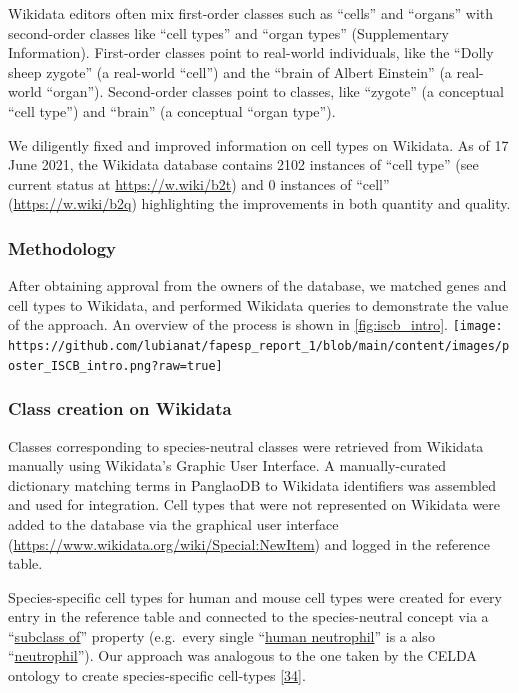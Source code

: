 Wikidata editors often mix first-order classes such as ``cells'' and ``organs'' with second-order classes like ``cell types'' and ``organ types'' (Supplementary Information). First-order classes point to real-world individuals, like the ``Dolly sheep zygote'' (a real-world ``cell'') and the ``brain of Albert Einstein'' (a real-world ``organ''). Second-order classes point to classes, like ``zygote'' (a conceptual ``cell type'') and ``brain'' (a conceptual ``organ type'').

We diligently fixed and improved information on cell types on Wikidata.
As of 17 June 2021, the Wikidata database contains 2102 instances of ``cell type'' (see current status at \url{https://w.wiki/b2t}) and 0 instances of ``cell'' (\url{https://w.wiki/b2q}) highlighting the improvements in both quantity and quality.

\hypertarget{methodology-1}{%
\subsubsection{Methodology}\label{methodology-1}}

After obtaining approval from the owners of the database, we matched genes and cell types to Wikidata, and performed Wikidata queries to demonstrate the value of the approach. An overview of the process is shown in \ref{fig:iscb_intro}.
\texttt{[image: https://github.com/lubianat/fapesp\_report\_1/blob/main/content/images/poster\_ISCB\_intro.png?raw=true]}

\hypertarget{class-creation-on-wikidata}{%
\subsubsection{Class creation on Wikidata}\label{class-creation-on-wikidata}}

Classes corresponding to species-neutral classes were retrieved from Wikidata manually using Wikidata's Graphic User Interface.
A manually-curated dictionary matching terms in PanglaoDB to Wikidata identifiers was assembled and used for integration.
Cell types that were not represented on Wikidata were added to the database via the graphical user interface (\url{https://www.wikidata.org/wiki/Special:NewItem}) and logged in the reference table.

Species-specific cell types for human and mouse cell types were created for every entry in the reference table and connected to the species-neutral concept via a ``\href{http://www.wikidata.org/entity/P279}{subclass of}'' property (e.g.~every single ``\href{http://www.wikidata.org/entity/Q101405102}{human neutrophil}'' is a also ``\href{http://www.wikidata.org/entity/Q188417}{neutrophil}'').
Our approach was analogous to the one taken by the CELDA ontology to create species-specific cell-types {[}\protect\hyperlink{ref-RLHsA1U8}{34}{]}.

